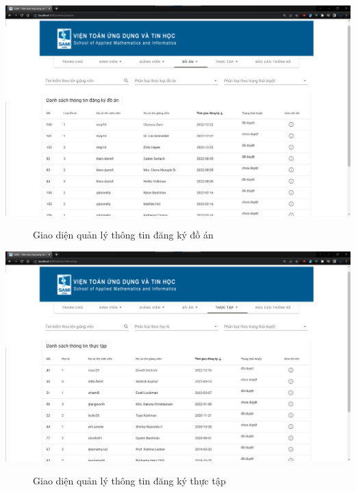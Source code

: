     \begin{center}
      \includegraphics[width=1\textwidth]{./image/design/admin/da.png}
      \begin{figure}[h]
        \centering
        \caption{Giao diện quản lý thông tin đăng ký đồ án}
      \end{figure}
    \end{center}
    \begin{center}
      \includegraphics[width=1\textwidth]{./image/design/admin/tt.png}
      \begin{figure}[h]
        \centering
        \caption{Giao diện quản lý thông tin đăng ký thực tập}
      \end{figure}
    \end{center}
